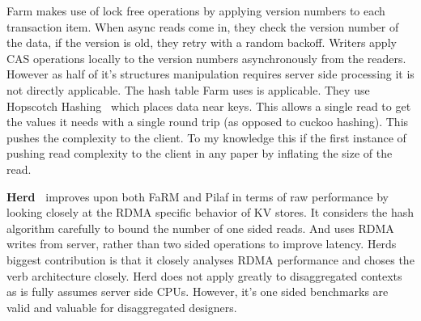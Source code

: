 Farm makes use of lock free operations by applying version numbers to each
transaction item. When async reads come in, they check the version number of the
data, if the version is old, they retry with a random backoff. Writers apply CAS
operations locally to the version numbers asynchronously from the readers.
However as half of it's structures manipulation requires server side processing
it is not directly applicable. The hash table Farm uses is applicable. They use
Hopscotch Hashing~\cite{hopscotch} which places data near keys. This allows a
single read to get the values it needs with a single round trip (as opposed to
cuckoo hashing). This pushes the complexity to the client. To my knowledge this
if the first instance of pushing read complexity to the client in any paper by
inflating the size of the read.


\textbf{Herd~\cite{herd}} improves upon both FaRM and Pilaf in terms of raw
performance by looking closely at the RDMA specific behavior of KV stores. It
considers the hash algorithm carefully to bound the number of one sided reads.
And uses RDMA writes from server, rather than two sided operations to improve
latency. Herds biggest contribution is that it closely analyses RDMA performance
and choses the verb architecture closely. Herd does not apply greatly to
disaggregated contexts as is fully assumes server side CPUs. However, it's one
sided benchmarks are valid and valuable for disaggregated designers.


